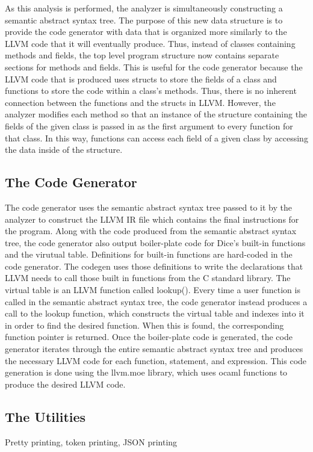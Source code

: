 \begin{homeworkProblem}
	As this analysis is performed, the analyzer is simultaneously constructing a semantic abstract syntax tree. The purpose of this new data structure is to provide the code generator with data that is organized more similarly to the LLVM code that it will eventually produce. Thus, instead of classes containing methods and fields, the top level program structure now contains separate sections for methods and fields. This is useful for the code generator because the LLVM code that is produced uses structs to store the fields of a class and functions to store the code within a class's methods. Thus, there is no inherent connection between the functions and the structs in LLVM. However, the analyzer modifies each method so that an instance of the structure containing the fields of the given class is passed in as the first argument to every function for that class. In this way, functions can access each field of a given class by accessing the data inside of the structure. 
	\subsection{The Code Generator}
    
    The code generator uses the semantic abstract syntax tree passed to it by the analyzer to construct the LLVM IR file which contains the final instructions for the program. Along with the code produced from the semantic abstract syntax tree, the code generator also output boiler-plate code for Dice's built-in functions and the virutual table. Definitions for built-in functions are hard-coded in the code generator. The codegen uses those definitions to write the declarations that LLVM needs to call those built in functions from the C standard library. The virtual table is an LLVM function called lookup(). Every time a user function is called in the semantic abstract syntax tree, the code generator instead produces a call to the lookup function, which constructs the virtual table and indexes into it in order to find the desired function. When this is found, the corresponding function pointer is returned. 
    Once the boiler-plate code is generated, the code generator iterates through the entire semantic abstract syntax tree and produces the necessary LLVM code for each function, statement, and expression. This code generation is done using the llvm.moe library, which uses ocaml functions to produce the desired LLVM code. 


	\subsection{The Utilities}
	Pretty printing, token printing, JSON printing

\end{homeworkProblem}
